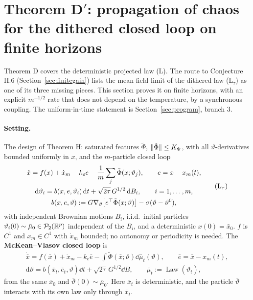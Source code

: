 \section{Theorem D$'$: propagation of chaos for the dithered closed loop on finite horizons}\label{sec:thmDprime}

Theorem D covers the deterministic projected law (L). The route to Conjecture H.6 (Section~\ref{sec:finitegain}) lists
the mean-field limit of the dithered law \textup{(L$_\tau$)} as one of its three missing pieces. This section proves
it on finite horizons, with an explicit $m^{-1/2}$ rate that does not depend on the temperature, by a synchronous
coupling. The uniform-in-time statement is Section~\ref{sec:program}, branch 3.

\paragraph{Setting.} The design of Theorem H: saturated features $\tilde\Phi$, $\lVert \tilde\Phi\rVert \le K_\Phi$, with
all $\vartheta$-derivatives bounded uniformly in $x$, and the $m$-particle closed loop
\begin{equation}\label{eq:thmDprime:Ltau}
  \begin{gathered}
    \dot x = f(x) + \dot x_m - k_e e - \frac1m\sum_j\tilde\Phi(x;\vartheta_j),\qquad e = x - x_m(t),\\
    \mathrm{d}\vartheta_i = b(x,e,\vartheta_i)\dd t + \sqrt{2\tau}\,G^{1/2}\dd B_i,\qquad i = 1,\dots,m,\\
    b(x,e,\vartheta) := G\nabla_\vartheta\bigl[e^\T\tilde\Phi(x;\vartheta)\bigr] - \sigma(\vartheta - \vartheta^0),
  \end{gathered}
  \tag{$\mathrm{L}_\tau$}
\end{equation}
with independent Brownian motions $B_i$, i.i.d.\ initial particles $\vartheta_i(0)\sim\bar\mu_0\in\mathcal{P}_2(\mathbb{R}^p)$
independent of the $B_i$, and a deterministic $x(0) = \bar x_0$. $f$ is $C^1$ and $x_m\in C^1$ with $\dot x_m$ bounded;
no autonomy or periodicity is needed. The \textbf{McKean--Vlasov closed loop} is
\begin{equation}\label{eq:thmDprime:MV}
  \begin{gathered}
    \dot{\bar x} = f(\bar x) + \dot x_m - k_e\bar e - \int\tilde\Phi(\bar x;\vartheta)\dd\bar\mu_t(\vartheta),\qquad
    \bar e = \bar x - x_m(t),\\
    \mathrm{d}\bar\vartheta = b(\bar x_t,\bar e_t,\bar\vartheta)\dd t + \sqrt{2\tau}\,G^{1/2}\dd B,\qquad
    \bar\mu_t := \operatorname{Law}(\bar\vartheta_t),
  \end{gathered}
  \tag{MV}
\end{equation}
from the same $\bar x_0$ and $\bar\vartheta(0)\sim\bar\mu_0$. Here $\bar x_t$ is deterministic, and the particle
$\bar\vartheta$ interacts with its own law only through $\bar x_t$.

